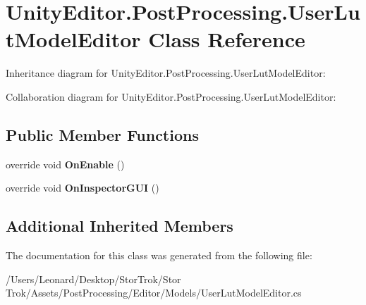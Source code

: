 \hypertarget{class_unity_editor_1_1_post_processing_1_1_user_lut_model_editor}{}\section{Unity\+Editor.\+Post\+Processing.\+User\+Lut\+Model\+Editor Class Reference}
\label{class_unity_editor_1_1_post_processing_1_1_user_lut_model_editor}


Inheritance diagram for Unity\+Editor.\+Post\+Processing.\+User\+Lut\+Model\+Editor\+:


Collaboration diagram for Unity\+Editor.\+Post\+Processing.\+User\+Lut\+Model\+Editor\+:
\subsection*{Public Member Functions}
\begin{DoxyCompactItemize}
\item 
\mbox{\label{class_unity_editor_1_1_post_processing_1_1_user_lut_model_editor_af7261e180a19f86a6379cd13d76fec2e}} 
override void {\bfseries On\+Enable} ()
\item 
\mbox{\label{class_unity_editor_1_1_post_processing_1_1_user_lut_model_editor_aebca737810782e9837ddd81529ac8542}} 
override void {\bfseries On\+Inspector\+G\+UI} ()
\end{DoxyCompactItemize}
\subsection*{Additional Inherited Members}


The documentation for this class was generated from the following file\+:\begin{DoxyCompactItemize}
\item 
/\+Users/\+Leonard/\+Desktop/\+Stor\+Trok/\+Stor Trok/\+Assets/\+Post\+Processing/\+Editor/\+Models/User\+Lut\+Model\+Editor.\+cs\end{DoxyCompactItemize}
